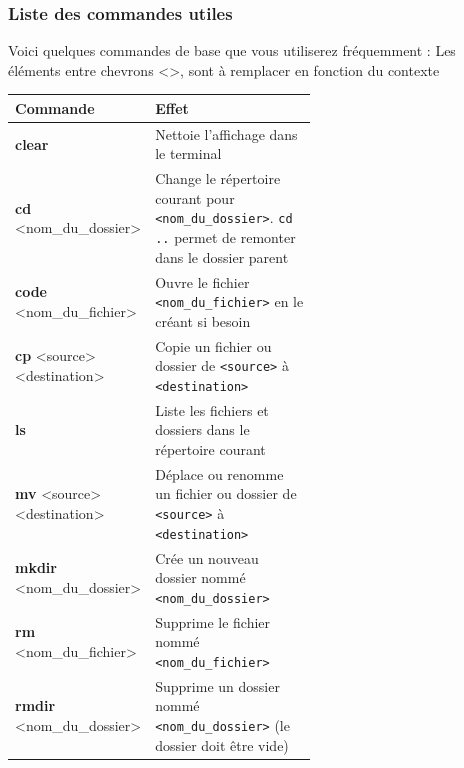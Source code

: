 \subsubsection{Liste des commandes utiles}
	Voici quelques commandes de base que vous utiliserez fréquemment :
	Les éléments entre chevrons <>, sont à remplacer en fonction du contexte
	\begin{center}
		\begin{tabular}{|l|p{0.6\linewidth}|}
			\hline
			\textbf{Commande}                                        & \textbf{Effet}                                                                                                       \\
			\hline
			{\textbf{clear}}                                               & Nettoie l'affichage dans le terminal    \\
			\hline   
			{\textbf{cd} <nom\_du\_dossier>}                            & Change le répertoire courant pour \texttt{<nom\_du\_dossier>}. \newline \texttt{cd ..} permet de remonter dans le dossier parent \\
			\hline
			{\textbf{code} <nom\_du\_fichier>}                          & Ouvre le fichier \texttt{<nom\_du\_fichier>} en le créant si besoin                                                  \\
			\hline
			{\textbf{cp} <source> <destination>}                        & Copie un fichier ou dossier de \texttt{<source>} à \texttt{<destination>}                                           \\
			\hline
			{\textbf{ls}}                                               & Liste les fichiers et dossiers dans le répertoire courant                                                           \\
			\hline
			{\textbf{mv} <source> <destination>}                        & Déplace ou renomme un fichier ou dossier de \texttt{<source>} à \texttt{<destination>}                              \\
			\hline
			{\textbf{mkdir} <nom\_du\_dossier>}                         & Crée un nouveau dossier nommé \texttt{<nom\_du\_dossier>}                                                            \\
			\hline
			{\textbf{rm} <nom\_du\_fichier>}                            & Supprime le fichier nommé \texttt{<nom\_du\_fichier>}                                                                \\
			\hline
			{\textbf{rmdir} <nom\_du\_dossier>}                         & Supprime un dossier nommé \texttt{<nom\_du\_dossier>} (le dossier doit être vide)                                    \\
			\hline
		\end{tabular}
	\end{center}


